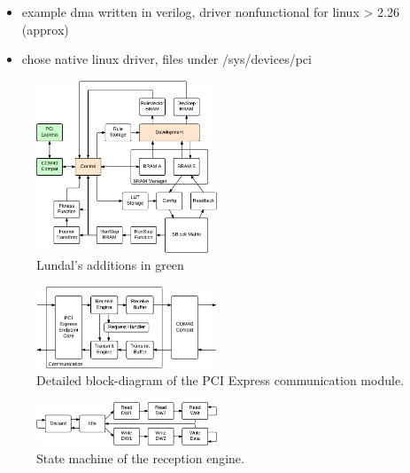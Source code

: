 
\TODO

\begin{itemize}
    \item example dma written in verilog, driver nonfunctional for linux > 2.26 (approx)
    \item chose native linux driver, files under /sys/devices/pci
\end{itemize}


\begin{figure}[!ht]
    \centering
    \includegraphics[width=0.48\textwidth]{figures/overview-lundal}
    \caption{Lundal's additions in green}
    \label{fig:overview-lundal}
\end{figure}


\begin{figure}[!ht]
    \centering
    \includegraphics[width=0.48\textwidth]{figures/details-communication}
    \caption{Detailed block-diagram of the PCI Express communication module.}
    \label{fig:details-communication}
\end{figure}


\begin{figure}[!ht]
    \centering
    \includegraphics[width=0.48\textwidth]{figures/statemachine-receive}
    \caption{State machine of the reception engine.}
    \label{fig:statemachine-receive}
\end{figure}


